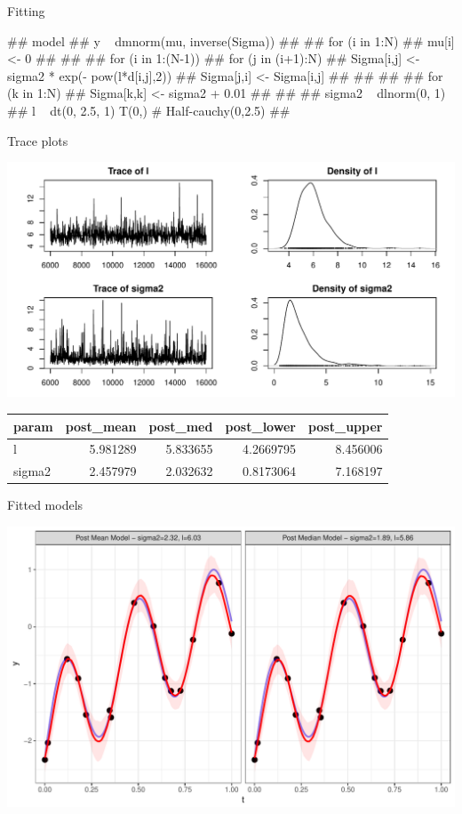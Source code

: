 \documentclass[11pt,ignorenonframetext,]{beamer}
\let\oldverbatim\verbatim
\let\endoldverbatim\endverbatim
\renewenvironment{verbatim}{\footnotesize\begin{spacing}{0.9}\oldverbatim}{\endoldverbatim\end{spacing}}
\begin{document}
\begin{frame}[fragile]{Fitting}

\begin{verbatim}
## model{
##   y ~ dmnorm(mu, inverse(Sigma))
## 
##   for (i in 1:N) {
##     mu[i] <- 0
##   }
## 
##   for (i in 1:(N-1)) {
##     for (j in (i+1):N) {
##       Sigma[i,j] <- sigma2 * exp(- pow(l*d[i,j],2))
##       Sigma[j,i] <- Sigma[i,j]
##     }
##   }
## 
##   for (k in 1:N) {
##     Sigma[k,k] <- sigma2 + 0.01
##   }
## 
##   sigma2   ~ dlnorm(0, 1)
##   l        ~ dt(0, 2.5, 1) T(0,) # Half-cauchy(0,2.5)
## }
\end{verbatim}

\end{frame}

\begin{frame}{Trace plots}

\includegraphics{Lec12_files/figure-beamer/unnamed-chunk-18-1.pdf}

\footnotesize

\begin{longtable}[]{@{}lrrrr@{}}
\toprule
param & post\_mean & post\_med & post\_lower &
post\_upper\tabularnewline
\midrule
\endhead
l & 5.981289 & 5.833655 & 4.2669795 & 8.456006\tabularnewline
sigma2 & 2.457979 & 2.032632 & 0.8173064 & 7.168197\tabularnewline
\bottomrule
\end{longtable}

\end{frame}

\begin{frame}{Fitted models}

\includegraphics{Lec12_files/figure-beamer/unnamed-chunk-20-1.pdf}

\end{frame}
\end{document}
